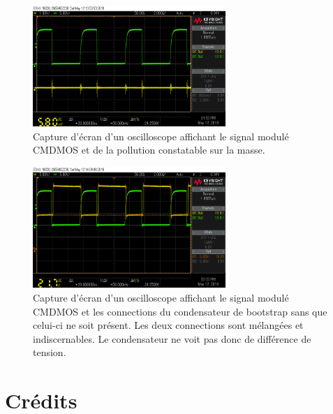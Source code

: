 \documentclass[10pt, oneside, a4paper]{article}
\begin{document}
\begin{figure}[p]
    \centering
    \includegraphics[width=0.65\textwidth]{image/12-05/scope_9.png}
    \caption{Capture d'écran d'un oscilloscope affichant le signal modulé CMDMOS et de
             la pollution constatable sur la masse.}
    \label{fig:scope-9}
\end{figure}

\begin{figure}[p]
    \centering
    \includegraphics[width=0.65\textwidth]{image/12-05/scope_10.png}
    \caption{Capture d'écran d'un oscilloscope affichant le signal modulé CMDMOS et les
             connections du condensateur de bootstrap sans que celui-ci ne soit présent.
             Les deux connections sont mélangées et indiscernables.
             Le condensateur ne voit pas donc de différence de tension.}
    \label{fig:scope-10}
\end{figure}


\pagebreak
{}
\section*{Crédits}
\end{document}
